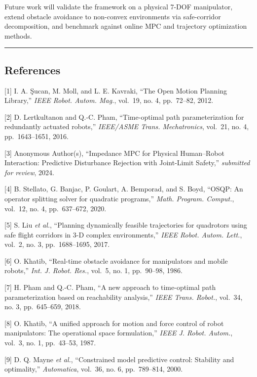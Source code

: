 Future work will validate the framework on a physical 7-DOF manipulator,
extend obstacle avoidance to non-convex environments via safe-corridor
decomposition, and benchmark against online MPC and trajectory
optimization methods.

\begin{center}\rule{0.5\linewidth}{0.5pt}\end{center}

\subsection{References}\label{references}

{[}1{]} I. A. Şucan, M. Moll, and L. E. Kavraki, ``The Open Motion
Planning Library,'' \emph{IEEE Robot. Autom. Mag.}, vol.~19, no. 4,
pp.~72--82, 2012.

{[}2{]} D. Lertkultanon and Q.-C. Pham, ``Time-optimal path
parameterization for redundantly actuated robots,'' \emph{IEEE/ASME
Trans. Mechatronics}, vol.~21, no. 4, pp.~1643--1651, 2016.

{[}3{]} Anonymous Author(s), ``Impedance MPC for Physical Human--Robot
Interaction: Predictive Disturbance Rejection with Joint-Limit Safety,''
\emph{submitted for review}, 2024.

{[}4{]} B. Stellato, G. Banjac, P. Goulart, A. Bemporad, and S. Boyd,
``OSQP: An operator splitting solver for quadratic programs,''
\emph{Math. Program. Comput.}, vol.~12, no. 4, pp.~637--672, 2020.

{[}5{]} S. Liu \emph{et al.}, ``Planning dynamically feasible
trajectories for quadrotors using safe flight corridors in 3-D complex
environments,'' \emph{IEEE Robot. Autom. Lett.}, vol.~2, no. 3,
pp.~1688--1695, 2017.

{[}6{]} O. Khatib, ``Real-time obstacle avoidance for manipulators and
mobile robots,'' \emph{Int. J. Robot. Res.}, vol.~5, no. 1, pp.~90--98,
1986.

{[}7{]} H. Pham and Q.-C. Pham, ``A new approach to time-optimal path
parameterization based on reachability analysis,'' \emph{IEEE Trans.
Robot.}, vol.~34, no. 3, pp.~645--659, 2018.

{[}8{]} O. Khatib, ``A unified approach for motion and force control of
robot manipulators: The operational space formulation,'' \emph{IEEE J.
Robot. Autom.}, vol.~3, no. 1, pp.~43--53, 1987.

{[}9{]} D. Q. Mayne \emph{et al.}, ``Constrained model predictive
control: Stability and optimality,'' \emph{Automatica}, vol.~36, no. 6,
pp.~789--814, 2000.

